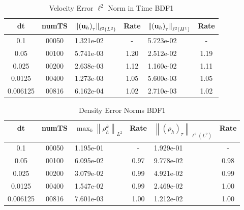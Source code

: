 \documentclass[letterpaper]{erdc}
\begin{document}
\begin{table}[h!]
  \begin{center}
    \caption{Velocity Error $\ell^2$ Norm in Time BDF1}
    \begin{tabular}{c|c|l|c|l|c}
      dt & numTS &  $\left\|\left(\textbf{u}_h\right)_{\tau}\right\|_{\ell^2(L^2)}$  &  Rate  &  $\left\|\left(\textbf{u}_h\right)_{\tau}\right\|_{\ell^2(H^1)}$  &  Rate\\
      \hline
      0.1     & 00050 &  1.321e-02 &  -  &  5.723e-02 &  -\\
      0.05    & 00100 &  5.741e-03 &  1.20  &  2.512e-02 &  1.19\\
      0.025   & 00200 &  2.638e-03 &  1.12  &  1.160e-02 &  1.11\\
      0.0125  & 00400 &  1.273e-03 &  1.05  &  5.600e-03 &  1.05\\
      0.006125 & 00816 &  6.162e-04 &  1.02  &  2.710e-03 &  1.02
    \end{tabular}
  \end{center}
\end{table}

\begin{table}[h!]
  \begin{center}
    \caption{Density Error Norms BDF1}
    \begin{tabular}{c|c|l|c|l|c}
      dt & numTS  & $\displaystyle\max_{k} \left\|\rho^{k}_{h}\right\|_{L^2}$ &  Rate  &  $\left\|\left(\rho_h\right)_{\tau}\right\|_{\ell^2(L^2)}$  &  Rate\\
      \hline
      0.1     & 00050  & 1.195e-01 &  -  &  1.929e-01 &  -\\
      0.05    & 00100  & 6.095e-02 &  0.97  &  9.778e-02 &  0.98\\
      0.025   & 00200  & 3.079e-02 &  0.99  &  4.921e-02 &  0.99\\
      0.0125  & 00400  & 1.547e-02 &  0.99  &  2.469e-02 &  1.00\\
      0.006125 & 00816  & 7.601e-03 &  1.00  &  1.212e-02 &  1.00
    \end{tabular}
  \end{center}
\end{table}
\end{document}
